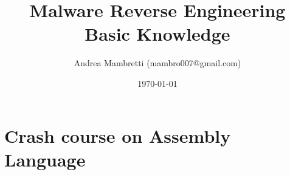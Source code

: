 \documentclass[]{beamer}
\title{Malware Reverse Engineering Basic Knowledge}    %
\author{Andrea Mambretti (mambro007@gmail.com)}        %
\institute{Politecnico di Milano}      %
\date{\today}                    %
\begin{document}
\begin{frame}
  \titlepage
\end{frame}

\section[Outline]{}

\begin{frame}
  \tableofcontents
\end{frame}
\section {Crash course on Assembly Language }
\end{document}
